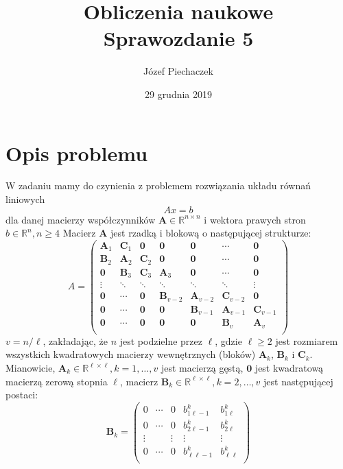 \documentclass[12pt]{article}
\title{
	Obliczenia naukowe \\
	Sprawozdanie 5
}
\date{29 grudnia 2019}
\author{Józef Piechaczek}
\begin{document}
\maketitle
\newpage
{}

\setlength{\abovedisplayskip}{5pt}
\setlength{\belowdisplayskip}{5pt}

\section*{Opis problemu}
W zadaniu mamy do czynienia z problemem rozwiązania układu równań liniowych
\begin{equation*}
	Ax = b
\end{equation*}
dla danej macierzy współczynników $\textbf{A} \in \mathbb{R}^{n \times n}$ i wektora prawych stron $b \in \mathbb{R}^n, n \geq 4$ Macierz $\textbf{A}$ jest rzadką i blokową o następującej strukturze:
\begin{equation}
A = 
\begin{pmatrix}
\textbf{A}_1 & \textbf{C}_1 & \textbf{0} & \textbf{0} & \textbf{0} & \cdots & \textbf{0} \\
\textbf{B}_2 & \textbf{A}_2 & \textbf{C}_2 & \textbf{0} & \textbf{0} & \cdots & \textbf{0} \\
\textbf{0} & \textbf{B}_3 & \textbf{C}_3 & \textbf{A}_3 & \textbf{0} & \cdots & \textbf{0} \\
\vdots & \ddots & \ddots & \ddots & \ddots & \ddots & \vdots \\
\textbf{0} & \cdots & \textbf{0} & \textbf{B}_{v-2} & \textbf{A}_{v-2} & \textbf{C}_{v-2} & \textbf{0} \\
\textbf{0} & \cdots & \textbf{0} & \textbf{0} & \textbf{B}_{v-1} & \textbf{A}_{v-1} & \textbf{C}_{v-1} \\
\textbf{0} & \cdots & \textbf{0} & \textbf{0} & \textbf{0} & \textbf{B}_{v} & \textbf{A}_{v} \\
\end{pmatrix}
\end{equation}
$v = n/\ell$, zakładając, że $n$ jest podzielne przez $\ell$, gdzie $\ell \geq 2 $ jest rozmiarem wszystkich kwadratowych macierzy wewnętrznych (bloków) $\textbf{A}_k$, $\textbf{B}_k$ i $\textbf{C}_k$. Mianowicie, $\textbf{A}_k \in \mathbb{R}^{\ell \times \ell}, k = 1, \dots, v$ jest macierzą gęstą, $\textbf{0}$ jest kwadratową macierzą zerową stopnia $\ell$, macierz $\textbf{B}_k \in  \mathbb{R}^{\ell \times \ell}, k = 2, \dots, v$ jest następującej postaci:
\begin{equation}
\textbf{B}_k = 
\begin{pmatrix}
0 & \cdots & 0 & b^k_{1 \ell-1} & b^k_{1 \ell} \\
0 & \cdots & 0 & b^k_{2 \ell-1} & b^k_{2 \ell} \\
\vdots & & \vdots & \vdots & \vdots \\
0 & \cdots & 0 & b^k_{\ell \ell-1} & b^k_{\ell \ell} \\
\end{pmatrix}
\end{equation}
\end{document}
